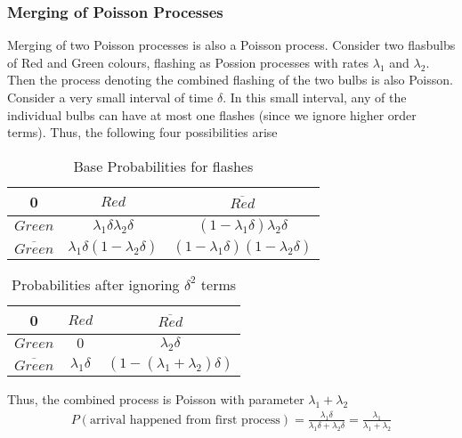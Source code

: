 \documentclass[../../probability-notes.tex]{subfiles}
\begin{document}
    \subsubsection{Merging of Poisson Processes}
    Merging of two Poisson processes is also a Poisson process. Consider two flasbulbs of Red and Green colours, flashing as Possion processes with rates $\lambda_{1}$ and $\lambda_{2}$. Then the process denoting the combined flashing of the two bulbs is also Poisson.\newline
    Consider a very small interval of time $\delta$. In this small interval, any of the individual bulbs can have at most one flashes (since we ignore higher order terms). Thus, the following four possibilities arise \newline
    \begin{table}[h]
    \centering
    \begin{tabular}{c|c|c}
        0 & $Red$ & $\overline{Red}$\\ \hline
        $Green$ & $\lambda_{1} \delta \lambda_{2} \delta $ & $(1-\lambda_{1}\delta)  \lambda_{2} \delta$\\ \hline
        $\overline{Green}$ & $\lambda_{1} \delta (1-\lambda_{2}\delta) $ & $(1-\lambda_{1}\delta) (1-\lambda_{2}\delta)$ \\
    \end{tabular}
    \caption{Base Probabilities for flashes}
    \end{table}
    \begin{table}[h]
    \centering
    \begin{tabular}{c|c|c}
        0 & $Red$ & $\overline{Red}$\\ \hline
        $Green$ & $0$ & $ \lambda_{2} \delta$\\ \hline
        $\overline{Green}$ & $\lambda_{1} \delta$ & $(1-(\lambda_{1} + \lambda_{2}) \delta)$ \\
    \end{tabular}
    \caption{Probabilities after ignoring $\delta^{2}$ terms}
    \end{table}

    Thus, the combined process is Poisson with parameter $\lambda_{1} + \lambda_{2}$ \newline
    \begin{align*}
    P(\text{arrival happened from first process}) = \frac{\lambda_{1} \delta}{\lambda_{1} \delta + \lambda_2 \delta} = \frac{\lambda_{1}}{\lambda_{1} + \lambda_{2}}
    \end{align*}
\end{document}
